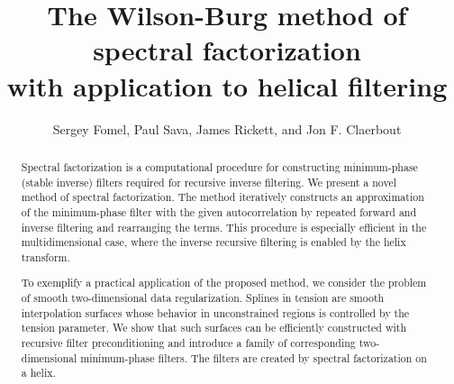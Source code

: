 

\lefthead{}
\righthead{}

\renewcommand{\thefootnote}{\fnsymbol{footnote}} 

\title{The Wilson-Burg method of spectral factorization \\
  with application to helical filtering}

\author{Sergey Fomel\/\footnotemark[1],
Paul Sava\/\footnotemark[2],
James Rickett\/\footnotemark[3],
and Jon F. Claerbout\/\footnotemark[2]} 


\maketitle

\begin{abstract}    
  Spectral factorization is a computational procedure for constructing
      minimum-phase (stable inverse) filters required for recursive
      inverse filtering. We present a novel method of spectral
      factorization. The method iteratively constructs an
      approximation of the minimum-phase filter with the given
      autocorrelation by repeated forward and inverse filtering and
      rearranging the terms. This procedure is especially efficient in
      the multidimensional case, where the inverse recursive filtering
      is enabled by the helix transform.
      
      To exemplify a practical application of the proposed method, we
      consider the problem of smooth two-dimensional data
      regularization. Splines in tension are smooth interpolation
      surfaces whose behavior in unconstrained regions is controlled
      by the tension parameter. We show that such surfaces can be
      efficiently constructed with recursive filter preconditioning
      and introduce a family of corresponding two-dimensional
      minimum-phase filters. The filters are created by spectral
      factorization on a helix.
\end{abstract}

